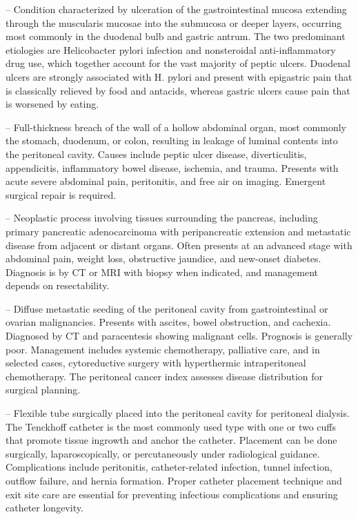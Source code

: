 -- Condition characterized by ulceration of the gastrointestinal mucosa extending through the muscularis mucosae into the submucosa or deeper layers, occurring most commonly in the duodenal bulb and gastric antrum. The two predominant etiologies are Helicobacter pylori infection and nonsteroidal anti-inflammatory drug use, which together account for the vast majority of peptic ulcers. Duodenal ulcers are strongly associated with H. pylori and present with epigastric pain that is classically relieved by food and antacids, whereas gastric ulcers cause pain that is worsened by eating.


-- Full-thickness breach of the wall of a hollow abdominal organ, most commonly the stomach, duodenum, or colon, resulting in leakage of luminal contents into the peritoneal cavity. Causes include peptic ulcer disease, diverticulitis, appendicitis, inflammatory bowel disease, ischemia, and trauma. Presents with acute severe abdominal pain, peritonitis, and free air on imaging. Emergent surgical repair is required.

-- Neoplastic process involving tissues surrounding the pancreas, including primary pancreatic adenocarcinoma with peripancreatic extension and metastatic disease from adjacent or distant organs. Often presents at an advanced stage with abdominal pain, weight loss, obstructive jaundice, and new-onset diabetes. Diagnosis is by CT or MRI with biopsy when indicated, and management depends on resectability.

-- Diffuse metastatic seeding of the peritoneal cavity from gastrointestinal or ovarian malignancies. Presents with ascites, bowel obstruction, and cachexia. Diagnosed by CT and paracentesis showing malignant cells. Prognosis is generally poor. Management includes systemic chemotherapy, palliative care, and in selected cases, cytoreductive surgery with hyperthermic intraperitoneal chemotherapy. The peritoneal cancer index assesses disease distribution for surgical planning.

-- Flexible tube surgically placed into the peritoneal cavity for peritoneal dialysis. The Tenckhoff catheter is the most commonly used type with one or two cuffs that promote tissue ingrowth and anchor the catheter. Placement can be done surgically, laparoscopically, or percutaneously under radiological guidance. Complications include peritonitis, catheter-related infection, tunnel infection, outflow failure, and hernia formation. Proper catheter placement technique and exit site care are essential for preventing infectious complications and ensuring catheter longevity.

